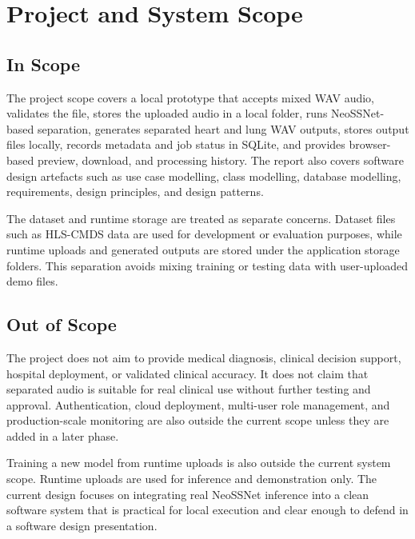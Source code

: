 \section{Project and System Scope}

\subsection{In Scope}

The project scope covers a local prototype that accepts mixed WAV audio, validates the file, stores the uploaded audio in a local folder, runs NeoSSNet-based separation, generates separated heart and lung WAV outputs, stores output files locally, records metadata and job status in SQLite, and provides browser-based preview, download, and processing history. The report also covers software design artefacts such as use case modelling, class modelling, database modelling, requirements, design principles, and design patterns.

The dataset and runtime storage are treated as separate concerns. Dataset files such as HLS-CMDS data are used for development or evaluation purposes, while runtime uploads and generated outputs are stored under the application storage folders. This separation avoids mixing training or testing data with user-uploaded demo files.

\subsection{Out of Scope}

The project does not aim to provide medical diagnosis, clinical decision support, hospital deployment, or validated clinical accuracy. It does not claim that separated audio is suitable for real clinical use without further testing and approval. Authentication, cloud deployment, multi-user role management, and production-scale monitoring are also outside the current scope unless they are added in a later phase.

Training a new model from runtime uploads is also outside the current system scope. Runtime uploads are used for inference and demonstration only. The current design focuses on integrating real NeoSSNet inference into a clean software system that is practical for local execution and clear enough to defend in a software design presentation.
